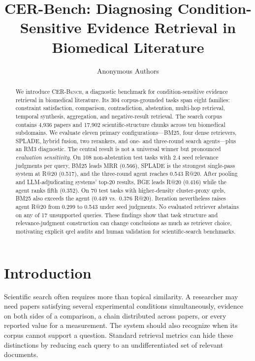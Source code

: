 \documentclass{article}
\title{CER-Bench: Diagnosing Condition-Sensitive Evidence Retrieval in Biomedical Literature}
\author{Anonymous Authors}
\newcommand{\cer}{\textsc{CER-Bench}}
\begin{document}
\maketitle

\begin{abstract}
We introduce \cer, a diagnostic benchmark for condition-sensitive evidence retrieval in biomedical literature. Its 304 corpus-grounded tasks span eight families: constraint satisfaction, comparison, contradiction, abstention, multi-hop retrieval, temporal synthesis, aggregation, and negative-result retrieval. The search corpus contains 4,936 papers and 17,902 scientific-structure chunks across ten biomedical subdomains. We evaluate eleven primary configurations---BM25, four dense retrievers, SPLADE, hybrid fusion, two rerankers, and one- and three-round search agents---plus an RM3 diagnostic. The central result is not a universal winner but pronounced \emph{evaluation sensitivity}. On 108 non-abstention test tasks with 2.4 seed relevance judgments per query, BM25 leads MRR (0.566), SPLADE is the strongest single-pass system at R@20 (0.517), and the three-round agent reaches 0.543 R@20. After pooling and LLM-adjudicating systems' top-20 results, BGE leads R@20 (0.416) while the agent ranks fifth (0.352). On 70 test tasks with higher-density cluster-proxy qrels, BM25 also exceeds the agent (0.449 vs.\ 0.376 R@20). Iteration nevertheless raises agent R@20 from 0.299 to 0.543 under seed judgments. No evaluated retriever abstains on any of 17 unsupported queries. These findings show that task structure and relevance-judgment construction can change conclusions as much as retriever choice, motivating explicit qrel audits and human validation for scientific-search benchmarks.
\end{abstract}

\section{Introduction}
\label{sec:intro}

Scientific search often requires more than topical similarity. A researcher may need papers satisfying several experimental conditions simultaneously, evidence on both sides of a comparison, a chain distributed across papers, or every reported value for a measurement. The system should also recognize when its corpus cannot support a question. Standard retrieval metrics can hide these distinctions by reducing each query to an undifferentiated set of relevant documents.
\end{document}
